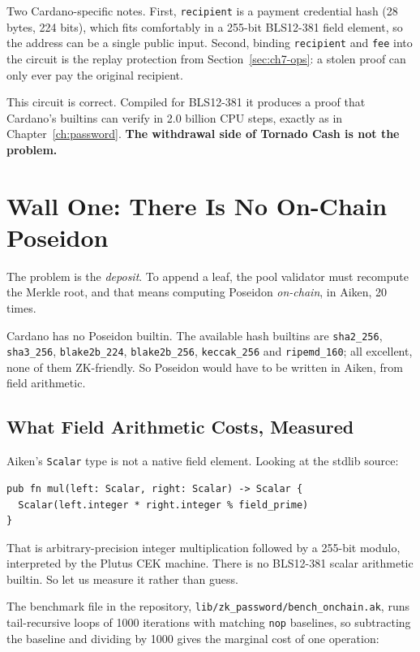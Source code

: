 Two Cardano-specific notes. First, \texttt{recipient} is a payment credential
hash (28 bytes, 224 bits), which fits comfortably in a 255-bit BLS12-381
field element, so the address can be a single public input. Second, binding
\texttt{recipient} and \texttt{fee} into the circuit is the replay protection
from Section~\ref{sec:ch7-ops}: a stolen proof can only ever pay the original
recipient.

This circuit is correct. Compiled for BLS12-381 it produces a proof that
Cardano's builtins can verify in 2.0 billion CPU steps, exactly as in
Chapter~\ref{ch:password}. \textbf{The withdrawal side of Tornado Cash is not the
problem.}

\section{Wall One: There Is No On-Chain Poseidon} \label{sec:ch8-wall1}

The problem is the \emph{deposit}. To append a leaf, the pool validator must
recompute the Merkle root, and that means computing Poseidon \emph{on-chain},
in Aiken, 20 times.

Cardano has no Poseidon builtin. The available hash builtins are
\texttt{sha2\_256}, \texttt{sha3\_256}, \texttt{blake2b\_224},
\texttt{blake2b\_256}, \texttt{keccak\_256} and \texttt{ripemd\_160}; all
excellent, none of them ZK-friendly. So Poseidon would have to be written in
Aiken, from field arithmetic.

\subsection*{What Field Arithmetic Costs, Measured}

Aiken's \texttt{Scalar} type is not a native field element. Looking at the
stdlib source:

\begin{verbatim}
pub fn mul(left: Scalar, right: Scalar) -> Scalar {
  Scalar(left.integer * right.integer % field_prime)
}
\end{verbatim}

That is arbitrary-precision integer multiplication followed by a 255-bit
modulo, interpreted by the Plutus CEK machine. There is no BLS12-381 scalar
arithmetic builtin. So let us measure it rather than guess.

The benchmark file in the repository,
\texttt{lib/zk\_password/bench\_onchain.ak}, runs tail-recursive loops of
1000 iterations with matching \texttt{nop} baselines, so subtracting the
baseline and dividing by 1000 gives the marginal cost of one operation:

